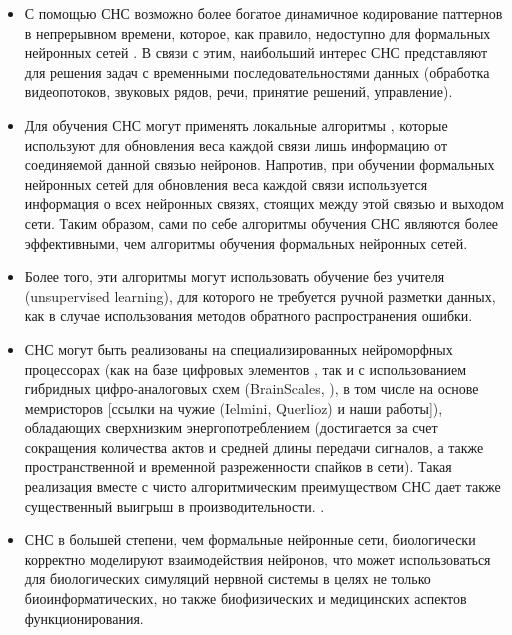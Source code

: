 \documentclass[a4paper]{article}
\begin{document}
\begin{itemize}
\item С помощью СНС возможно более богатое динамичное кодирование паттернов в непрерывном времени, которое, как правило, недоступно для формальных нейронных сетей \cite{Ismail_Fawaz_2019}. В связи с этим, наибольший интерес СНС представляют для решения задач с временными последовательностями данных (обработка видеопотоков, звуковых рядов, речи, принятие решений, управление).

\item Для обучения СНС могут применять локальные алгоритмы \cite{STDP, pehlevan2019spiking, Baldi_2016}, которые используют для обновления веса каждой связи лишь информацию от соединяемой данной связью нейронов. Напротив, при обучении формальных нейронных сетей для обновления веса каждой связи используется информация о всех нейронных связях, стоящих между этой связью и выходом сети. Таким образом, сами по себе алгоритмы обучения СНС являются более эффективными, чем алгоритмы обучения формальных нейронных сетей.

\item Более того, эти алгоритмы могут использовать обучение без учителя (unsupervised learning), для которого не требуется ручной разметки данных, как в случае использования методов обратного распространения ошибки.

\item СНС могут быть реализованы на специализированных нейроморфных процессорах (как на базе цифровых элементов \cite{TrueNorth, Loihi, Akida}, так и с использованием гибридных цифро-аналоговых схем (BrainScales, \cite{SpiNNaker}), в том числе на основе мемристоров [ссылки на чужие (Ielmini, Querlioz) и наши работы]), обладающих сверхнизким энергопотреблением (достигается за счет сокращения количества актов и средней длины передачи сигналов, а также пространственной и временной разреженности спайков в сети). Такая реализация вместе с чисто алгоритмическим преимуществом СНС дает также существенный выигрыш в производительности. \cite{hardware1, hardware2}. 

\item СНС в большей степени, чем формальные нейронные сети, биологически корректно моделируют взаимодействия нейронов, что может использоваться для биологических симуляций нервной системы в целях не только биоинформатических, но также биофизических и медицинских аспектов функционирования.
\end{itemize}
\end{document}
